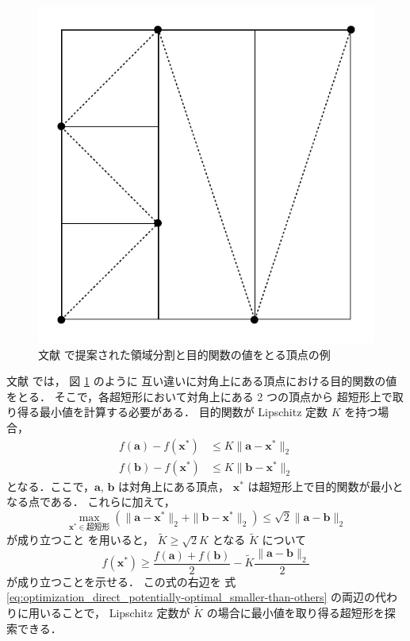 \begin{figure}[tp]
    \centering
    \includegraphics[width=0.7\linewidth]{optimization/ADC-partitions-image.pdf}
    \caption{文献 \cite{Sergeyev2000} で提案された領域分割と目的関数の値をとる頂点の例}
    \label{fig:optimization_adc_partitions-image}
\end{figure}

文献 \cite{Sergeyev2000} では，
図 \ref{fig:optimization_adc_partitions-image} のように
互い違いに対角上にある頂点における目的関数の値をとる．
そこで，各超短形において対角上にある 2 つの頂点から
超短形上で取り得る最小値を計算する必要がある．
目的関数が Lipschitz 定数 $K$ を持つ場合，
\begin{align}
    f(\bm{a}) - f(\bm{x}^*) &\le K \|\bm{a} - \bm{x}^*\|_2 \\
    f(\bm{b}) - f(\bm{x}^*) &\le K \|\bm{b} - \bm{x}^*\|_2
\end{align}
となる．ここで，$\bm{a}$, $\bm{b}$ は対角上にある頂点，
$\bm{x}^*$ は超短形上で目的関数が最小となる点である．
これらに加えて，
\begin{equation}
    \max_{\bm{x}^* \in \text{超短形}}{(\|\bm{a} - \bm{x}^*\|_2 + \|\bm{b} - \bm{x}^*\|_2)} \le \sqrt{2} \|\bm{a} - \bm{b}\|_2
\end{equation}
が成り立つこと \cite[Lemma 2.]{Molinaro2001} を用いると，
$\tilde{K} \ge \sqrt{2} K$ となる $\tilde{K}$ について
\begin{equation}
    f(\bm{x}^*) \ge \frac{f(\bm{a}) + f(\bm{b})}{2} - \tilde{K} \frac{\|\bm{a} - \bm{b}\|_2}{2}
\end{equation}
が成り立つことを示せる\cite[Theorem 2.1]{Sergeyev2006}．
この式の右辺を
式 \eqref{eq:optimization_direct_potentially-optimal_smaller-than-others}
の両辺の代わりに用いることで，
Lipschitz 定数が $\tilde{K}$ の場合に最小値を取り得る超短形を探索できる．
